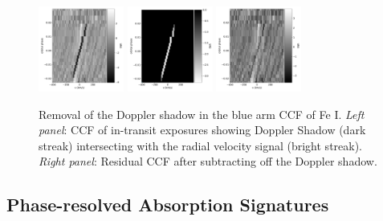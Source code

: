 \documentclass[twocolumn]{aastex631}
\begin{document}
            \begin{figure}
                \centering
                \includegraphics[width=0.25\textwidth]{plots/raw-ccf-before/KELT-20b.20190504.Fe.blue.CCFs-raw.pdf}
                \hspace{0.05\textwidth}
                \includegraphics[width=0.25\textwidth]{plots-final/raw-ccfs/doppler-shadow/KELT-20b.20190504.Fe.blue.DopplerShadow.pdf}
                \hspace{0.05\textwidth}
                \includegraphics[width=0.25\textwidth]{plots/raw-ccf-after/KELT-20b.20190504.Fe.blue.CCFs-raw.pdf}
                \caption{Removal of the Doppler shadow in the blue arm CCF of Fe I. \textit{Left panel}: CCF of in-transit exposures showing Doppler Shadow (dark streak) intersecting with the radial velocity signal (bright streak). \textit{Right panel}: Residual CCF after subtracting off the Doppler shadow.}
                \label{fig:doppler-shadow-removal}
            \end{figure}
        
        \subsection{Phase-resolved Absorption Signatures}\label{subsec:Line Velocities}
\end{document}
